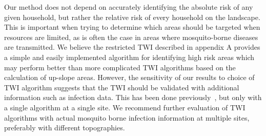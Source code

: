 \documentclass[10pt,letterpaper]{article}\usepackage[]{graphicx}\usepackage[]{color}
\begin{document}
Our method does not depend on accurately identifying the absolute risk of any given household, but rather the relative risk of every household on the landscape.  This is important when trying to determine which areas should be targeted when resources are limited, as is often the case in areas where mosquito-borne diseases are transmitted. We believe the restricted TWI described in appendix A provides a simple and easily implemented algorithm for identifying high risk areas which may perform better than more complicated TWI algorithms based on the calculation of up-slope areas.  However, the sensitivity of our results to choice of TWI algorithm suggests that the TWI should be validated with additional information such as infection data.  This has been done previously~\cite{Cohen2008, Cohen2010},  but only with a single algorithm at a single site.  We recommend further evaluation of TWI algorithms with actual mosquito borne infection information at multiple sites, preferably with different topographies.\\


\nolinenumbers
\end{document}

